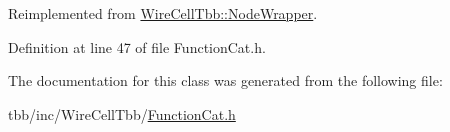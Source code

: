 Reimplemented from \hyperlink{class_wire_cell_tbb_1_1_node_wrapper_a4ed2daeddbb2f75934759ac8f9a3ce8b}{Wire\+Cell\+Tbb\+::\+Node\+Wrapper}.



Definition at line 47 of file Function\+Cat.\+h.



The documentation for this class was generated from the following file\+:\begin{DoxyCompactItemize}
\item 
tbb/inc/\+Wire\+Cell\+Tbb/\hyperlink{_function_cat_8h}{Function\+Cat.\+h}\end{DoxyCompactItemize}
